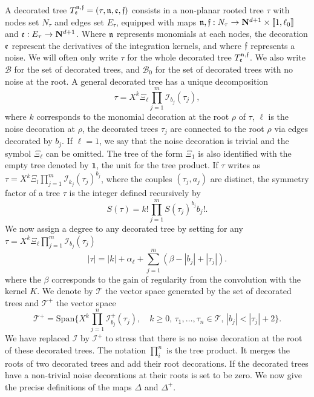\documentclass[11pt]{preprint}
\newcommand{\mcB}{\mathcal{B}}
\newcommand{\mcI}{\mathcal{I}}
\newcommand{\mcT}{\mathcal{T}}
\def\one{\mathbf{1}}
\newcommand{\bfN}{\mathbf{N}}
\newcommand{\bbrack}[1]{ \llbracket #1 \rrbracket }
\begin{document}
	A decorated tree $T_{\frak e}^{\frak n, \frak f}=(\tau,\frak n, \frak e,\frak f)$ consists in a non-planar rooted tree $\tau$ with nodes set $N_\tau$ and edges set $E_\tau$, equipped with maps $\frak{n},\frak{f} : N_\tau\to \bfN^{d+1} \times \bbrack{1,\ell_0} $ and $\frak e : E_\tau \to \bfN^{d+1}$. Where $\frak{n}$ represents monomials at each nodes, the decoration $\frak{e}$ represent the derivatives of  the integration kernels, and where $\frak{f}$ represents a noise. We will often only write $\tau$ for the whole decorated tree $T_{\frak e}^{\frak n, \frak f}$. 
	We also write $\mcB$ for the set of decorated trees, and $\mcB_0$ for the set of decorated trees with no noise at the root. A general decorated tree has a unique decomposition 
	$$
	\tau = X^k\Xi_\ell \prod_{j=1}^m \mcI_{b_j}(\tau_j),
	$$
	where $ k $ corresponds to the monomial decoration at the root $ \rho $ of $\tau$, $\ell$ is the noise decoration at $\rho$, the decorated trees $\tau_j$ are connected to the root $\rho$ via edges decorated by $b_j$. If $ \ell= 1 $, we say that  the noise decoration is trivial and the symbol $\Xi_{\ell}$ can be omitted. The tree of the form $\Xi_{1}$ is also identified with the empty tree denoted by $\one$, the unit for the tree product.
		If $\tau$ writes as $\tau = X^k\Xi_l \prod_{j=1}^m \mcI_{k_j}(\tau_j)^{b_j}$, where the couples $(\tau_j,a_j)$ are distinct, the symmetry factor of a tree $\tau$ is the integer defined recursively by \label{symmetry_factor}
	$$
	S(\tau)=k! \prod_{j=1}^m S(\tau_j)^{b_j}b_j!.
	$$
	We now assign a degree to any decorated tree by setting for any $\tau = X^k\Xi_\ell \prod_{j=1}^m \mcI_{b_j}(\tau_j)$
	\begin{equation} \label{degree_tree}
	|\tau| = |k|+\alpha_\ell + \sum_{j=1}^m (\beta-|b_j| + |\tau_j|).
\end{equation}
	where the $\beta$ corresponds to the gain of regularity from the convolution with the kernel $K$.
	We denote by  $\mathcal{T}$ the vector space generated by the set of decorated trees and $\mathcal{T}^+$ the vector space
	$$
	\mathcal{T}^+ = \text{Span} \{  X^k\prod_{j=1}^n \mcI^+_{b_j}
	(\tau_j) ,\quad  k\geq0, \, \tau_1,\dots,\tau_n \in\mcT , \, |b_j|<|\tau_j|+2    \}.
	$$
\label{I_+}	We have replaced $ \mcI $ by $ \mcI^{+} $ to stress that there is no noise decoration at the root of these decorated trees. The notation $ \prod_{i}^n $ is the tree product. It merges the roots of two  decorated trees and add their root decorations.
	If the decorated trees have a non-trivial noise decorations at their roots is set to be zero. 
		We now give the precise definitions of the maps $ \Delta $ and $ \Delta^{\!+} $.
\end{document}
